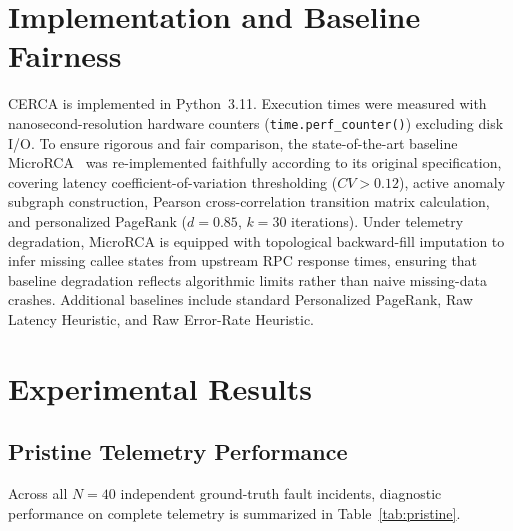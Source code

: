 \documentclass[conference]{IEEEtran}
\begin{document}
\section{Implementation and Baseline Fairness}

CERCA is implemented in Python~3.11. Execution times were measured with nanosecond-resolution hardware counters (\texttt{time.perf\_counter()}) excluding disk I/O. To ensure rigorous and fair comparison, the state-of-the-art baseline MicroRCA~\cite{wu2020} was re-implemented faithfully according to its original specification, covering latency coefficient-of-variation thresholding ($CV > 0.12$), active anomaly subgraph construction, Pearson cross-correlation transition matrix calculation, and personalized PageRank ($d = 0.85$, $k = 30$ iterations). Under telemetry degradation, MicroRCA is equipped with topological backward-fill imputation to infer missing callee states from upstream RPC response times, ensuring that baseline degradation reflects algorithmic limits rather than naive missing-data crashes. Additional baselines include standard Personalized PageRank, Raw Latency Heuristic, and Raw Error-Rate Heuristic.

\section{Experimental Results}

\subsection{Pristine Telemetry Performance}
Across all $N = 40$ independent ground-truth fault incidents, diagnostic performance on complete telemetry is summarized in Table~\ref{tab:pristine}.
\end{document}

